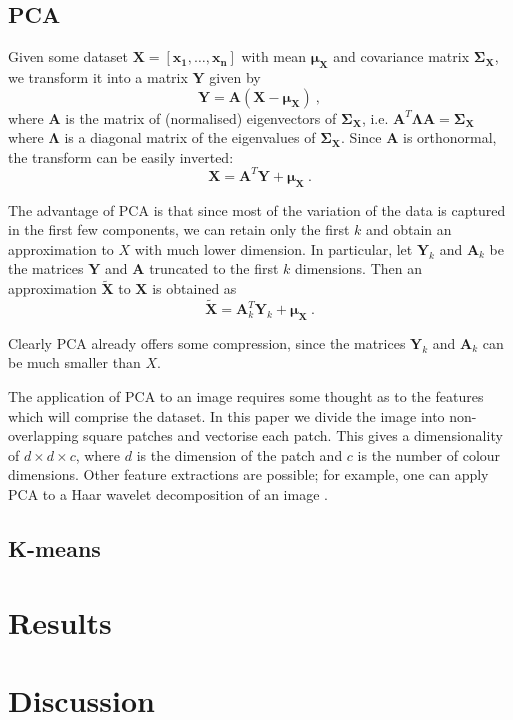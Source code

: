 \documentclass[10pt,conference,compsocconf]{IEEEtran}
\begin{document}
\subsection{PCA}
Given some dataset $\mathbf{X} = [\mathbf{x_1}, \ldots, \mathbf{x_n}]$ with mean $\mathbf{\mu_X}$ and covariance matrix $\mathbf{\Sigma_X}$, we transform it into a matrix $\mathbf{Y}$ given by
\begin{equation*}
	\mathbf{Y} = \mathbf{A} (\mathbf{X} - \mathbf{\mu_X}) ~ ,
\end{equation*}
where $\mathbf{A}$ is the matrix of (normalised) eigenvectors of $\mathbf{\Sigma_X}$, i.e. $\mathbf{A}^T \mathbf{\Lambda} \mathbf{A} = \mathbf{\Sigma_X}$ where $\mathbf{\Lambda}$ is a diagonal matrix of the eigenvalues of $\mathbf{\Sigma_X}$. Since $\mathbf{A}$ is orthonormal, the transform can be easily inverted:
\begin{equation*}
	\mathbf{X} = \mathbf{A}^T \mathbf{Y} + \mathbf{\mu_X} ~ .
\end{equation*}

The advantage of PCA is that since most of the variation of the data is captured in the first few components, we can retain only the first $k$ and obtain an approximation to $X$ with much lower dimension. In particular, let $\mathbf{Y}_k$ and $\mathbf{A}_k$ be the matrices $\mathbf{Y}$ and $\mathbf{A}$ truncated to the first $k$ dimensions. Then an approximation $\mathbf{\tilde X}$ to $\mathbf{X}$ is obtained as
\begin{equation*}
	\mathbf{\tilde X} = \mathbf{A}_k^T \mathbf{Y}_k + \mathbf{\mu_X} ~ .
\end{equation*}

Clearly PCA already offers some compression, since the matrices $\mathbf{Y}_k$ and $\mathbf{A}_k$ can be much smaller than $X$.

The application of PCA to an image requires some thought as to the features which will comprise the dataset. In this paper we divide the image into non-overlapping square patches and vectorise each patch. This gives a dimensionality of $d \times d \times c$, where $d$ is the dimension of the patch and $c$ is the number of colour dimensions. Other feature extractions are possible; for example, one can apply PCA to a Haar wavelet decomposition of an image \cite{tong2010wavelet}.

\subsection{K-means}

\section{Results}
\label{results}

\section{Discussion}
\label{discussion}



\end{document}
